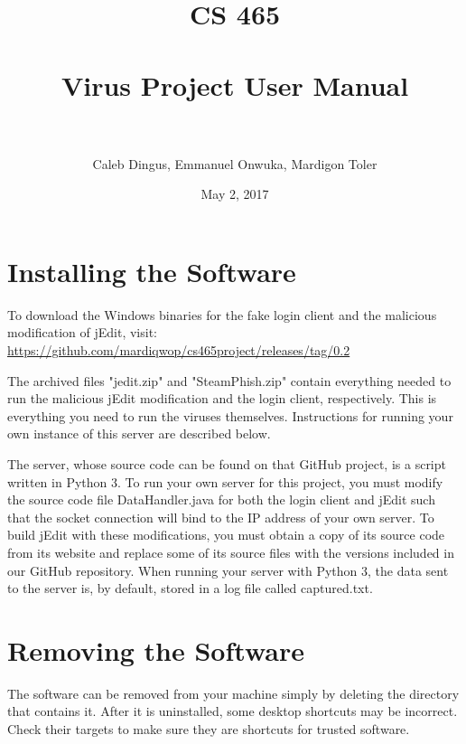 \documentclass[paper=a4, fontsize=11pt]{scrartcl} %
\title{	
\normalfont \normalsize 
\textsc{CS 465} \\ [25pt] %
\horrule{0.5pt} \\[0.4cm] %
\huge Virus Project User Manual \\ %
\horrule{2pt} \\[0.5cm] %
}
\author{Caleb Dingus, Emmanuel Onwuka, Mardigon Toler} %
\date{May 2, 2017} %
\numberwithin{equation}{section} %
\numberwithin{figure}{section} %
\numberwithin{table}{section} %
\begin{document}
\maketitle %

\section{Installing the Software}

To download the Windows binaries for the fake login client and the malicious modification of jEdit, visit:
\url{https://github.com/mardiqwop/cs465project/releases/tag/0.2}

\vspace{5mm}

The archived files "jedit.zip" and "SteamPhish.zip" contain everything needed to run the malicious jEdit modification and the login client, respectively. 
This is everything you need to run the viruses themselves. Instructions for running your own instance of this server are described below. 
\vspace{5mm}

The server, whose source code can be found on that GitHub project, is a script written in Python 3. To run your own server for this project,
you must modify the source code file DataHandler.java for both the login client and jEdit such that the socket connection will bind to the IP address of your own server. To build jEdit with these modifications, you must obtain a copy of
its source code from its website and replace some of its source files with the versions included in our GitHub repository.
When running your server with Python 3, the data sent to the server is, by default, stored in a log file called captured.txt.

\section{Removing the Software}
The software can be removed from your machine simply by deleting the directory that contains it.
After it is uninstalled, some desktop shortcuts may be incorrect. Check their targets to make sure they are shortcuts for trusted software.
\end{document}
